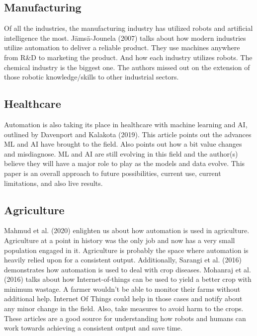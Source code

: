 \documentclass[
  man]{apa7}
\begin{document}
\hypertarget{manufacturing}{%
\subsection{Manufacturing}\label{manufacturing}}

Of all the industries, the manufacturing industry has utilized robots and artificial intelligence the most. Jämsä-Jounela (2007) talks about how modern industries utilize automation to deliver a reliable product. They use machines anywhere from R\&D to marketing the product. And how each industry utilizes robots. The chemical industry is the biggest one. The authors missed out on the extension of those robotic knowledge/skills to other industrial sectors.

\hypertarget{healthcare}{%
\subsection{Healthcare}\label{healthcare}}

Automation is also taking its place in healthcare with machine learning and AI, outlined by Davenport and Kalakota (2019). This article points out the advances ML and AI have brought to the field. Also points out how a bit value changes and misdiagnose. ML and AI are still evolving in this field and the author(s) believe they will have a major role to play as the models and data evolve. This paper is an overall approach to future possibilities, current use, current limitations, and also live results.

\hypertarget{agriculture}{%
\subsection{Agriculture}\label{agriculture}}

Mahmud et al. (2020) enlighten us about how automation is used in agriculture. Agriculture at a point in history was the only job and now has a very small population engaged in it. Agriculture is probably the space where automation is heavily relied upon for a consistent output. Additionally, Sarangi et al. (2016) demonstrates how automation is used to deal with crop diseases. Mohanraj et al. (2016) talks about how Internet-of-things can be used to yield a better crop with minimum wastage. A farmer wouldn't be able to monitor their farms without additional help. Internet Of Things could help in those cases and notify about any minor change in the field. Also, take measures to avoid harm to the crops. These articles are a good source for understanding how robots and humans can work towards achieving a consistent output and save time.
\end{document}
